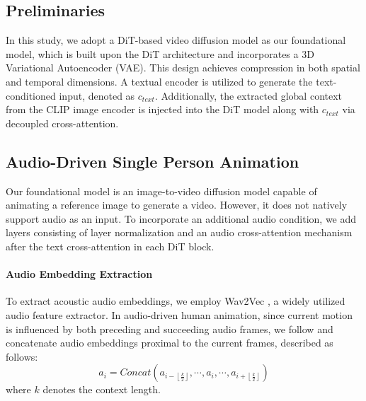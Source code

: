 \documentclass{article}
\begin{document}
\subsection{Preliminaries}
\label{sec:pre}


In this study, we adopt a DiT-based video diffusion model as our foundational model, which is built upon the DiT architecture and incorporates a 3D Variational Autoencoder (VAE). This design achieves compression in both spatial and temporal dimensions. A textual encoder is utilized to generate the text-conditioned input, denoted as $c_{text}$. 
Additionally, the extracted global context from the CLIP image encoder \cite{radford2021learning} is injected into the DiT model along with $c_{text}$ via decoupled cross-attention.



\subsection{Audio-Driven Single Person Animation}
\label{sec:single-human}

Our foundational model is an image-to-video diffusion model capable of animating a reference image to generate a video. However, it does not natively support audio as an input. To incorporate an additional audio condition, we add layers consisting of layer normalization and an audio cross-attention mechanism after the text cross-attention in each DiT block.


\paragraph{Audio Embedding Extraction}
To extract acoustic audio embeddings, we employ Wav2Vec \cite{baevski2020wav2vec}, a widely utilized audio feature extractor. In audio-driven human animation, since current motion is influenced by both preceding and succeeding audio frames, we follow \cite{tian2024emo} and concatenate audio embeddings proximal to the current frames, described as follows:
\begin{equation}
\label{eq:concat-audio}
a_i = Concat(a_{i- \left \lfloor \frac{k}{2} \right \rfloor}, \cdots, a_{i}, \cdots, a_{i+ \left \lfloor \frac{k}{2} \right \rfloor})
\end{equation}
where $k$ denotes the context length.
\end{document}
